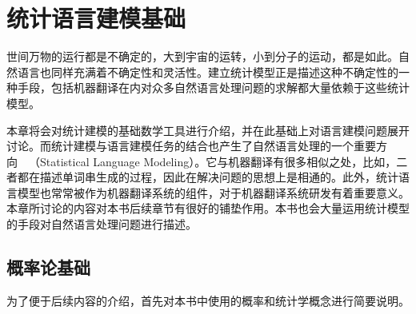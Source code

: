 
%


\renewcommand\figurename{图}%
\renewcommand\tablename{表}%


\chapter{统计语言建模基础}

\parinterval 世间万物的运行都是不确定的，大到宇宙的运转，小到分子的运动，都是如此。自然语言也同样充满着不确定性和灵活性。建立统计模型正是描述这种不确定性的一种手段，包括机器翻译在内对众多自然语言处理问题的求解都大量依赖于这些统计模型。

\parinterval 本章将会对统计建模的基础数学工具进行介绍，并在此基础上对语言建模问题展开讨论。而统计建模与语言建模任务的结合也产生了自然语言处理的一个重要方向\ \dash\ {\small{}}（Statistical Language Modeling）。它与机器翻译有很多相似之处，比如，二者都在描述单词串生成的过程，因此在解决问题的思想上是相通的。此外，统计语言模型也常常被作为机器翻译系统的组件，对于机器翻译系统研发有着重要意义。本章所讨论的内容对本书后续章节有很好的铺垫作用。本书也会大量运用统计模型的手段对自然语言处理问题进行描述。


\section{概率论基础}
\parinterval 为了便于后续内容的介绍，首先对本书中使用的概率和统计学概念进行简要说明。

